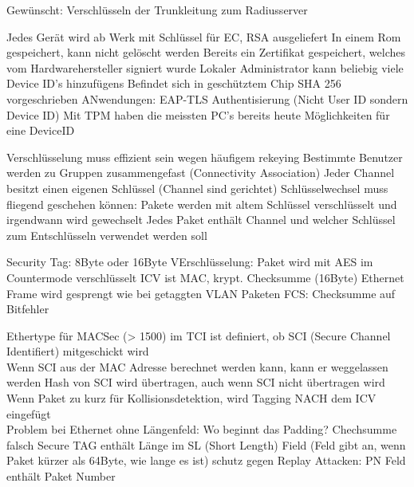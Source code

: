 \documentclass[ngerman,a4paper,12pt]{scrreprt}
\begin{document}
Gewünscht: Verschlüsseln der Trunkleitung zum Radiusserver

\ul
	\li Jedes Gerät wird ab Werk mit Schlüssel für EC, RSA ausgeliefert
	\li In einem Rom gespeichert, kann nicht gelöscht werden
	\li Bereits ein Zertifikat gespeichert, welches vom Hardwarehersteller signiert wurde
	\li Lokaler Administrator kann beliebig viele Device ID's hinzufügens
	\li Befindet sich in geschütztem Chip
\ulE
{}
\ul
	\li SHA 256 vorgeschrieben
	\li ANwendungen: EAP-TLS Authentisierung (Nicht User ID sondern Device ID)
	\li Mit TPM haben die meissten PC's bereits heute Möglichkeiten für eine DeviceID
\ulE

\ul
	\li Verschlüsselung muss effizient sein wegen häufigem rekeying
	\li Bestimmte Benutzer werden zu Gruppen zusammengefast (Connectivity Association)
\ulE
{}
\ul
	\li Jeder Channel besitzt einen eigenen Schlüssel (Channel sind gerichtet)
	\li Schlüsselwechsel muss fliegend geschehen können: Pakete werden mit altem Schlüssel verschlüsselt und irgendwann wird gewechselt
	\li Jedes Paket enthält Channel und welcher Schlüssel zum Entschlüsseln verwendet werden soll
\ulE
{}


\ul
	\li Security Tag: 8Byte oder 16Byte
	\li VErschlüsselung: Paket wird mit AES im Countermode verschlüsselt
	\li ICV ist MAC, krypt. Checksumme (16Byte)
	\li Ethernet Frame wird gesprengt wie bei getaggten VLAN Paketen
	\li FCS: Checksumme auf Bitfehler
\ulE

\ul
	\li Ethertype für MACSec (> 1500)
	\li im TCI ist definiert, ob SCI (Secure Channel Identifiert) mitgeschickt wird \\
	\ra Wenn SCI aus der MAC Adresse berechnet werden kann, kann er weggelassen werden
	\li Hash von SCI wird übertragen, auch wenn SCI nicht übertragen wird
	\li Wenn Paket zu kurz für Kollisionsdetektion, wird Tagging NACH dem ICV eingefügt \\
		\ra Problem bei Ethernet ohne Längenfeld: Wo beginnt das Padding? Chechsumme falsch \ra Secure TAG enthält Länge im SL (Short Length) Field (Feld gibt an, wenn Paket kürzer als 64Byte, wie lange es ist)
	\li schutz gegen Replay Attacken: PN Feld enthält Paket Number
\ulE
\end{document}
